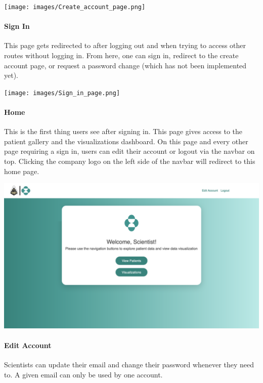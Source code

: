 \documentclass[]{book}
\let\oldparagraph\paragraph
\renewcommand{\paragraph}[1]{\oldparagraph{#1}\mbox{}}
\begin{document}
\texttt{[image: images/Create\_account\_page.png]}

\hypertarget{sign-in}{%
\paragraph{Sign In}\label{sign-in}}

This page gets redirected to after logging out and when trying to access other routes without logging in. From here, one can sign in, redirect to the create account page, or request a password change (which has not been implemented yet).

\texttt{[image: images/Sign\_in\_page.png]}

\hypertarget{home}{%
\paragraph{Home}\label{home}}

This is the first thing users see after signing in. This page gives access to the patient gallery and the visualizations dashboard. On this page and every other page requiring a sign in, users can edit their account or logout via the navbar on top. Clicking the company logo on the left side of the navbar will redirect to this home page.

\includegraphics{images/home_page.png}

\hypertarget{edit-account}{%
\paragraph{Edit Account}\label{edit-account}}

Scientists can update their email and change their password whenever they need to. A given email can only be used by one account.
\end{document}
